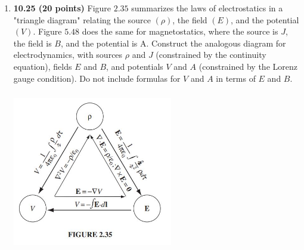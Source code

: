 \documentclass[fleqn]{article}
\begin{document}
\begin{enumerate}
    \item \textbf{10.25 (20 points)} Figure $2.35$ summarizes the laws of electrostatics in a "triangle
    diagram" relating the source $(\rho)$, the field $(E)$, and the potential $(V)$. Figure $5.48$
    does the same for magnetostatics, where the source is $J$, the field is $B$, and the
    potential is A. Construct the analogous diagram for electrodynamics, with sources
    $\rho$ and $J$ (constrained by the continuity equation), fields $E$ and $B$, and potentials $V$
    and $A$ (constrained by the Lorenz gauge condition). Do not include formulas for $V$
    and $A$ in terms of $E$ and $B$.
    \begin{center}
      \includegraphics[height=7cm, width=7cm]{2.JPG}
    \end{center}

    
  \end{enumerate}
\end{document}
